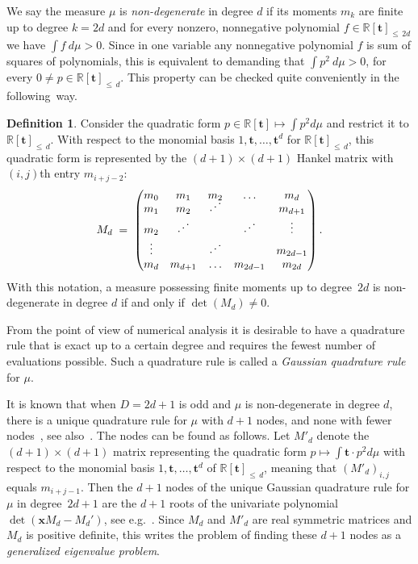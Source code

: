 \documentclass[11pt]{article}
\theoremstyle{definition}
\newtheorem{defi}[theo]{Definition}
\numberwithin{equation}{section}
\numberwithin{figure}{section}
\numberwithin{table}{section}
\newcommand{\iddots}{\mathinner{\mkern1mu\raise1pt\hbox{.}\mkern2mu\raise4pt\hbox{.}\mkern2mu\raise7pt\hbox{.}\mkern1mu}}
\newcommand\R{\mathbb R}
\renewcommand\t{\mathbf{t}}
\newcommand\x{\mathbf{x}}
\begin{document}
We say the measure $\mu$ is \emph{non-degenerate} in degree $d$ if its moments $m_k$ are finite up to degree $k=2d$ and for every nonzero, nonnegative polynomial $ f\in \R[\t]_{\leq\,2d}$ we have $\int f \ d\mu >0$. Since in one variable any nonnegative polynomial $f$ is sum of squares of polynomials, this is equivalent to demanding that $\int p^2 \ d\mu >0$, for every $0\neq p\in \R[\t]_{\leq\,d}$. This property can be checked quite conveniently in the following~way.


\begin{defi} \label{def:Mmatrix}
Consider the quadratic form $p\in \R[\t]\mapsto\int p^2 d\mu$ and restrict it to $\R[\t]_{\leq\,d}$. With respect to the monomial basis $1,\t,\hdots, \t^d$ for $\R[\t]_{\leq\,d}$, this quadratic form is represented by the $(d+1)\times (d+1)$ Hankel matrix with $(i,j)$th entry $m_{i+j-2}$:
\[
M_d \; = \;
\begin{pmatrix}
m_0 & m_1 & m_2 & \hdots &m_d \\
m_1 & m_2 & \iddots&&m_{d+1} \\
m_2 & \iddots& &\iddots&\vdots\\
\vdots&&\iddots&&m_{2d-1}\\
m_d &m_{d+1}&\hdots&m_{2d-1}&m_{2d}
\end{pmatrix}.
\]
With this notation, a measure possessing finite moments up to degree~$2d$ is non-degenerate in degree $d$ if and only if $\det(M_d)\neq 0$.
\end{defi}


From the point of view of numerical analysis it is desirable to have a quadrature rule that is exact up to a certain degree and requires the fewest number of evaluations possible. Such a quadrature rule is called a \emph{Gaussian quadrature rule} for $\mu$.

It is known that when $D=2d+1$ is odd and $\mu$ is non-degenerate in degree $d$, there is a unique quadrature rule for $\mu$ with $d+1$ nodes, and none with fewer nodes~\cite[Chapter~I, Theorem.~3]{anheizer}, see also~\cite[Theorem.~3.8]{curto}. The nodes can be found as follows. Let $M'_d$ denote the $(d+1)\times(d+1)$ matrix representing the quadratic form $p\mapsto \int \t \cdot p^2 d \mu$ with respect to the monomial basis $1,\t,\hdots, \t^d$ of $\R[\t]_{\leq \,d}$, meaning that $(M'_d)_{i,j}$ equals $m_{i+j-1}$. Then the $d+1$ nodes of the unique Gaussian quadrature rule for $\mu$ in degree~$2d+1$ are the $d+1$ roots of the univariate polynomial $\det(\x M_d - M_d') $, see e.g.~\cite[formule 2.2.9, p.~27]{sze}. Since $M_d$ and $M'_d$ are real symmetric matrices and $M_d$ is positive definite, this writes the problem of finding these $d+1$ nodes as a
\emph{generalized eigenvalue problem}.
\end{document}
